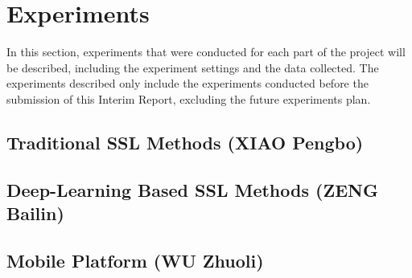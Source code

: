 \chapter*{Experiments}

In this section, experiments that were conducted for each part of the project will be described, including the experiment settings and the data collected. The experiments described only include the experiments conducted before the submission of this Interim Report, excluding the future experiments plan.



\section*{Traditional SSL Methods (XIAO Pengbo)}



\section*{Deep-Learning Based SSL Methods (ZENG Bailin)}



\section*{Mobile Platform (WU Zhuoli)}

